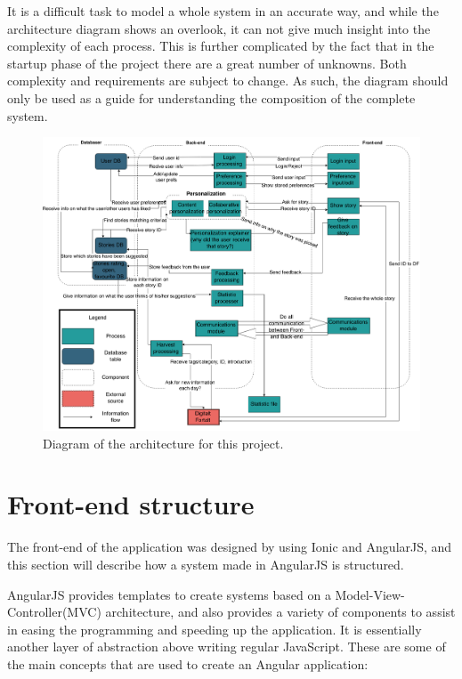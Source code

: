 It is a difficult task to model a whole system in an accurate way, and while the architecture diagram shows an overlook, it can not give much insight into the complexity of each process. This is further complicated by the fact that in the startup phase of the project there are a great number of unknowns. Both complexity and requirements are subject to change. As such, the diagram should only be used as a guide for understanding the composition of the complete system.

\begin{figure}[h!]
	\centering
	\includegraphics[width=\textwidth]{fig/architecture}
	\caption{Diagram of the architecture for this project.}
	\label{Fig:architecture}
\end{figure}

\section{Front-end structure}
\label{sec:frontend_structure}
The front-end of the application was designed by using Ionic and AngularJS, and this section will describe how a system made in AngularJS is structured.

AngularJS provides templates to create systems based on a Model-View-Controller(MVC) architecture, and also provides a variety of components to assist in easing the programming and speeding up the application. It is essentially another layer of abstraction above writing regular JavaScript. These are some of the main concepts that are used to create an Angular application:


